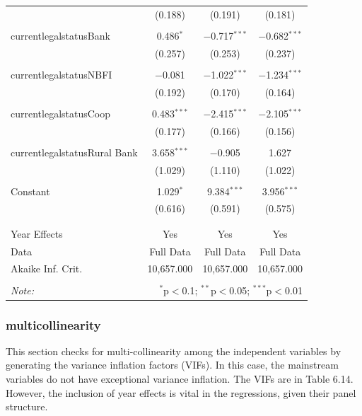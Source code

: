 \documentclass[a4paper, nobind]{templates/ociamthesis}
\begin{document}
\begin{table}[!htbp]
\begin{tabular}{@{\extracolsep{5pt}}lccc}
  & (0.188) & (0.191) & (0.181) \\ 
  & & & \\ 
 currentlegalstatusBank & 0.486$^{*}$ & $-$0.717$^{***}$ & $-$0.682$^{***}$ \\ 
  & (0.257) & (0.253) & (0.237) \\ 
  & & & \\ 
 currentlegalstatusNBFI & $-$0.081 & $-$1.022$^{***}$ & $-$1.234$^{***}$ \\ 
  & (0.192) & (0.170) & (0.164) \\ 
  & & & \\ 
 currentlegalstatusCoop & 0.483$^{***}$ & $-$2.415$^{***}$ & $-$2.105$^{***}$ \\ 
  & (0.177) & (0.166) & (0.156) \\ 
  & & & \\ 
 currentlegalstatusRural Bank & 3.658$^{***}$ & $-$0.905 & 1.627 \\ 
  & (1.029) & (1.110) & (1.022) \\ 
  & & & \\ 
 Constant & 1.029$^{*}$ & 9.384$^{***}$ & 3.956$^{***}$ \\ 
  & (0.616) & (0.591) & (0.575) \\ 
  & & & \\ 
\hline \\[-1.8ex] 
Year Effects & Yes & Yes & Yes \\ 
Data & Full Data & Full Data & Full Data \\ 
Akaike Inf. Crit. & 10,657.000 & 10,657.000 & 10,657.000 \\ 
\hline 
\hline \\[-1.8ex] 
\textit{Note:}  & \multicolumn{3}{r}{$^{*}$p$<$0.1; $^{**}$p$<$0.05; $^{***}$p$<$0.01} \\ 
\end{tabular} 
\end{table}

\hypertarget{multicollinearity-1}{%
\subsubsection{multicollinearity}\label{multicollinearity-1}}

This section checks for multi-collinearity among the independent variables by generating the variance inflation factors (VIFs). In this case, the mainstream variables do not have exceptional variance inflation. The VIFs are in Table 6.14. However, the inclusion of year effects is vital in the regressions, given their panel structure.
\end{document}
